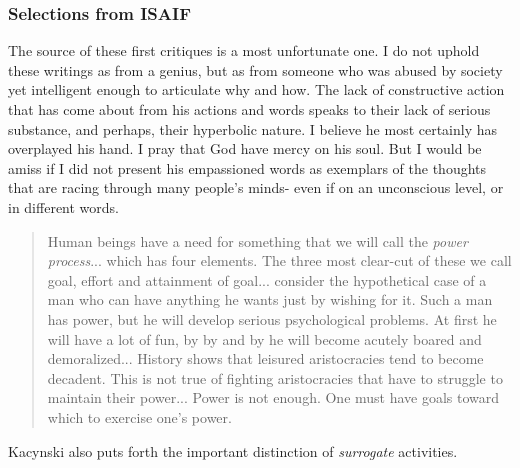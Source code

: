 

\subsubsection{Selections from ISAIF}

The source of these first critiques is a most unfortunate one. I do not uphold these writings as from a genius, but as from someone who was abused by society yet intelligent enough to articulate why and how. The lack of constructive action that has come about from his actions and words speaks to their lack of serious substance, and perhaps, their hyperbolic nature. I believe he most certainly has overplayed his hand. I pray that God have mercy on his soul. But I would be amiss if I did not present his empassioned words as exemplars of the thoughts that are racing through many people's minds- even if on an unconscious level, or in different words.

\begin{quote}
Human beings have a need for something that we will call the \textit{power process}... which has four elements. The three most clear-cut of these we call goal, effort and attainment of goal... consider the hypothetical case of a man who can have anything he wants just by wishing for it. Such a man has power, but he will develop serious psychological problems. At first he will have a lot of fun, by by and by he will become acutely boared and demoralized... History shows that leisured aristocracies tend to become decadent. This is not true of fighting aristocracies that have to struggle to maintain their power... Power is not enough. One must have goals toward which to exercise one's power.
\end{quote}

Kacynski also puts forth the important distinction of \textit{surrogate} activities.

